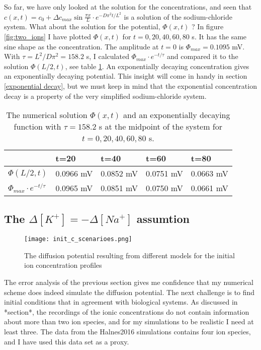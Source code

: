 \documentclass{article}
\begin{document}
So far, we have only looked at the solution for the concentrations, and seen that $c(x,t) =c_0 + \Delta c_{max} \sin \frac{ \pi x}{L}\cdot e^{-D\pi^2 t /L^2}$ is a solution of the sodium-chloride system. What about the solution for the potential, $\Phi(x,t)$ ? In figure \ref{fig:two_ions} I have plotted $\Phi(x,t)$ for $t=0,20,40,60,80$ s. It has the same sine shape as the concentration. The amplitude at $t=0$ is $\Phi_{max} = 0.1095$ mV. With $\tau = L^2/D\pi^2 = 158.2$ s, I calculated $\Phi_{max} \cdot e^{-t/{\tau}}$ and compared it to the solution $\Phi(L/2,t)$, see table \ref{tab:error2}. An exponentially decaying concentration gives an exponentially decaying potential. This insight will come in handy in section \ref{exponential decay}, but we must keep in mind that the exponential concentration decay is a property of the very simplified sodium-chloride system. 

\begin{table}[h!]
  \centering
  \caption{The numerical solution $\Phi(x,t)$ and an exponentially decaying function with $\tau = 158.2$ s at the midpoint of the system for $t=0,20,40,60,80$ s. }
  \label{tab:error2}
  \begin{tabular}{l||l|l|l|l}
 & t=20 & t=40 & t=60 & t=80\\
 \hline
$\Phi(L/2,t)$  & 0.0966 mV &  0.0852 mV & 0.0751 mV & 0.0663 mV\\
\hline
$\Phi_{max} \cdot e^{-t/{\tau}}$  & 0.0965 mV & 0.0851 mV & 0.0750 mV & 0.0661 mV\\


 \end{tabular}
\end{table}


\subsection{The $\Delta [K^+] = - \Delta [Na^+] $ assumtion}\label{The K/Na assumtion}

\begin{figure}
  \texttt{[image: init\_c\_scenarioes.png]}
  \caption{The diffusion potential resulting from different models for the initial ion concentration profiles}
  \label{fig:init_c_scenarioes}
\end{figure}
The error analysis of the previous section gives me confidence that my numerical scheme does indeed simulate the diffusion potential. The next challenge is to find initial conditions that in agreement with biological systems. As discussed in *section*, the recordings of the ionic concentrations do not contain information about more than two ion species, and for my simulations to be realistic I need at least three. The data from the Halnes2016 simulations contains four ion species, and I have used this data set as a proxy.
\end{document}

